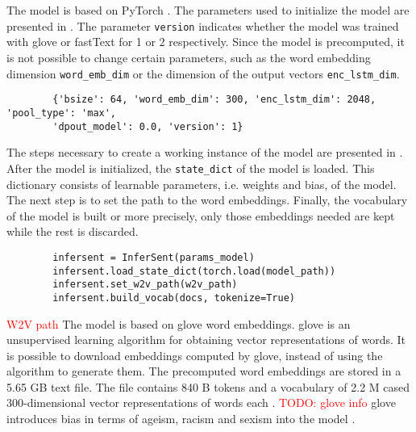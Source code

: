 \section{\infersent{}}\label{sec:impl-infersent}

The \infersent{} model is based on PyTorch \cite{HfsentTrans2019}.
The parameters used to initialize the model are presented in .
The parameter \texttt{version} indicates whether the model was trained with \acs{glove} or fastText for 1 or 2 respectively.
Since the model is precomputed, it is not possible to change certain parameters, 
such as the word embedding dimension \texttt{word\_emb\_dim} or the dimension of the output vectors \texttt{enc\_lstm\_dim}.

\begin{listing}[htp]
    \begin{verbatim}
        {'bsize': 64, 'word_emb_dim': 300, 'enc_lstm_dim': 2048, 'pool_type': 'max', 
        'dpout_model': 0.0, 'version': 1}
    \end{verbatim}
    \caption{Parameters of the \infersent{} model.
    }
    \label{lst:infersent-params}
\end{listing}

The steps necessary to create a working instance of the \infersent{} model are presented in .
After the \infersent{} model is initialized, the \texttt{state\_dict} of the model is loaded.
This dictionary consists of learnable parameters, i.e. weights and bias, of the model.
The next step is to set the path to the word embeddings.
Finally, the vocabulary of the model is built or more precisely, only those embeddings needed are kept while the rest is discarded.

\begin{listing}[htp]
    \begin{verbatim}
        infersent = InferSent(params_model)
        infersent.load_state_dict(torch.load(model_path))
        infersent.set_w2v_path(w2v_path)
        infersent.build_vocab(docs, tokenize=True)
    \end{verbatim}
    \caption{Initializing the \infersent{} model.
    }
    \label{lst:infersent-init}
\end{listing}

\textcolor{red}{W2V path}
The \infersent{} model is based on \acs{glove} word embeddings.
\acs{glove} is an unsupervised learning algorithm for obtaining vector representations of words. 
It is possible to download embeddings computed by \acs{glove}, instead of using the algorithm to generate them.
The precomputed word embeddings are stored in a 5.65 GB text file.
The file contains 840 B tokens and a vocabulary of 2.2 M cased 300-dimensional vector representations of words each \cite{download-glove}.
\textcolor{red}{TODO: glove info \cite{glove2014}}
\acs{glove} introduces bias in terms of ageism, racism and sexism into the model \cite{UniversalSentEnc2018}.

